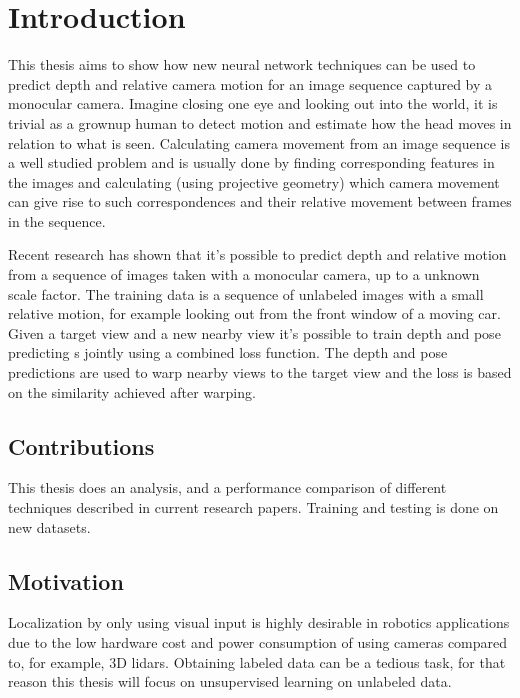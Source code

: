\chapter{Introduction}\label{cha:intro}

This thesis aims to show how new neural network techniques can be used to predict depth and relative camera motion for an image sequence captured by a monocular \abbrRGB camera. Imagine closing one eye and looking out into the world, it is trivial as a grownup human to detect motion and estimate how the head moves in relation to what is seen. Calculating camera movement from an image sequence is a well studied problem and is usually done by finding corresponding features in the images and calculating (using projective geometry) which camera movement can give rise to such correspondences and their relative movement between frames in the sequence.

Recent research has shown that it's possible to predict depth and relative motion from a sequence of images taken with a monocular \abbrRGB camera, up to a unknown scale factor. The training data is a sequence of unlabeled images with a small relative motion, for example looking out from the front window of a moving car. Given a target view and a new nearby view it's possible to train depth and pose predicting \abbrCNN{}s jointly using a combined loss function. The depth and pose predictions are used to warp nearby views to the target view and the loss is based on the similarity achieved after warping.

\section{Contributions}

This thesis does an analysis, and a performance comparison of different techniques described in current research papers. Training and testing is done on new datasets.

\section{Motivation}

Localization by only using visual input is highly desirable in robotics applications due to the low hardware cost and power consumption of using cameras compared to, for example, 3D lidars. Obtaining labeled data can be a tedious task, for that reason this thesis will focus on unsupervised learning on unlabeled data.

